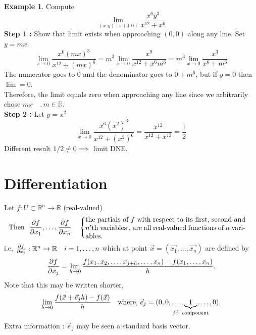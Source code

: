 \documentclass[
	12pt,
	]{article}
\newcommand{\Rn}{\mathbb{R}^{n}}
\newcommand{\R}{\mathbb{R}}
\theoremstyle{custom}
\theoremstyle{custom}
\theoremstyle{custom}
\theoremstyle{custom}
\theoremstyle{custom}
\theoremstyle{definition}
\newtheorem{example}{Example}[section]
\theoremstyle{example}
\theoremstyle{note}
\theoremstyle{remark}
\theoremstyle{example}
\newcounter{theo}[section]\setcounter{theo}{0}
\numberwithin{equation}{subsection}
\begin{document}
		\begin{example}
			Compute 
			$$ \lim_{(x,y) \to (0,0)} \frac{x^{6}y^{3}}{x^{12}+x^{6}}$$
			\textbf{Step 1 :} Show that limit exists when approaching $(0,0)$ along any line. Set $y= mx$.
			\begin{equation*}
				\lim_{x \to 0} \frac{x^{6}(mx)^{3}}{x^{12}+(mx)^{6}}= m^{3} \lim_{x\to 0} \frac{x^{9}}{x^{12}+x^{6}m^{6}} = m^{3} \lim_{x\to 0} \frac{x^{3}}{x^{6} + m^{6}}
			\end{equation*}
			The numerator goes to $0$ and the denominator goes to $0+m^{6}$, but if $y=0$ then $\lim = 0$.\\
			Therefore, the limit equals zero when approaching any line since we arbitrarily chose $mx \quad , m \in \R$. \\
			\textbf{Step 2 : } Let $y = x^{2}$ 
			\begin{equation*}
				\lim_{x\to 0} \frac{x^{6}(x^{2})^{3}}{x^{12}+(x^{2})^{6}} = \frac{x^{12}}{x^{12}+x^{12}} = \frac12 
			\end{equation*} 
			Different result $1/2 \neq 0 \implies $ limit DNE. 
		\end{example}
		
		\newpage \section{Differentiation}
			Let $f: U \subset \Rn \to \R$ (real-valued) \\
			\begin{equation*}
				\begin{split}
					\text{Then } \ \pdv{f}{x_{1}} , \dots , \pdv{f}{x_{n}} 
				\end{split}
				\quad 
				\begin{cases}
					\parbox{8cm}{the partials of $f$ with respect to its first, second and $n$'th variables , are all real-valued functions of $n$ variables.}
				\end{cases}
			\end{equation*}
			i.e, $\pdv{f}{x_{i}} : \Rn \to \R \quad i = 1 , \dots ,n $ which at point $\vec{x} = (\vec{x_{1}} , \dots, \vec{x_{n}})$ are defined by 
			$$ \pdv{f}{x_{j}} (x_{1}, \dots, x_{n}) = \lim_{h \to 0} \frac{f(x_{1},x_{2},\dots, x_{j+h},\dots ,x_{n}) - f(x_{1},\dots , x_{n})}{h}.$$
			Note that this may be written shorter, 
			$$ \lim_{h\to 0  } \frac{f(\vec{x} + \vec{e}_{j}h) - f(\vec{x})}{h} \quad \text{where, } \vec{e}_{j} = (0,0, \dots ,\underbrace{1}_{\mathclap{\text{$j^{\text{th}}$ component}}} ,\dots , 0).$$
 			Extra information : $\vec{e}_{j}  $ may be seen a standard basis vector.
 			
\end{document}

